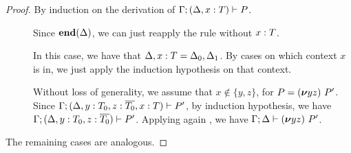 \begin{proof}
  By induction on the derivation of 
  $\Gamma; (\Delta, x : T) \vdash P$.
  \begin{description}
  \item[] Since $\mathbf{end}(\Delta)$, we can just reapply
    the rule without $x : T$.
    
  \item[] In this case, we have that
    $\Delta, x : T = \Delta_0, \Delta_1$.  By cases on which
    context $x$ is in, we just apply the induction hypothesis on
    that context.
  \item[] Without loss of generality, we assume that
    $x \notin \{y,z\}$, for $P=(\bm{\nu} yz)~P'$. Since
    $\Gamma;(\Delta, y : T_0, z : \overline{T_0}, x : T) \vdash P'$, by
    induction hypothesis, we have
    $\Gamma;(\Delta, y : T_0, z : \overline{T_0}) \vdash P'$. Applying
    again , we have
    $\Gamma;\Delta \vdash (\bm{\nu} yz)~P'$.
  \end{description}
  The remaining cases are analogous.
\end{proof}

